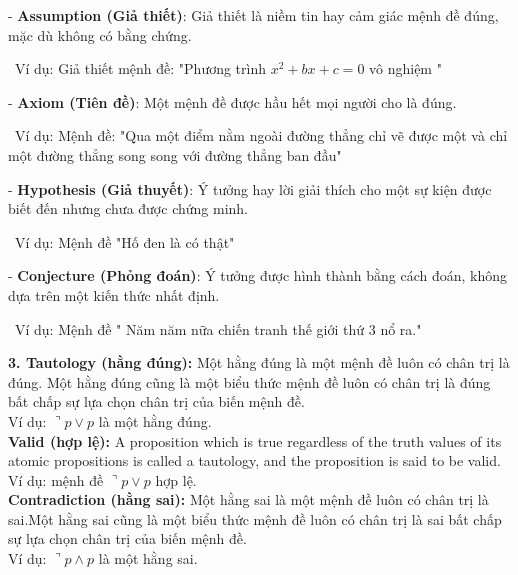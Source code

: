 \documentclass[a4paper]{article}
\begin{document}
{\large\hspace{1cm}- \textbf{Assumption (Giả thiết)}: Giả thiết là niềm tin hay cảm giác mệnh đề đúng, mặc dù không có bằng chứng.
	
\ Ví dụ: Giả thiết mệnh đề: "Phương trình $x^2 + bx + c = 0$ vô nghiệm "}

{\large\hspace{1cm}- \textbf{Axiom (Tiên đề)}: Một mệnh đề được hầu hết mọi người cho là đúng.
	
\ Ví dụ: Mệnh đề: "Qua một điểm nằm ngoài đường thẳng chỉ vẽ được một và chỉ một đường thẳng song song với đường thẳng ban đầu"}

{\large\hspace{1cm}- \textbf{Hypothesis (Giả thuyết)}: Ý tưởng hay lời giải thích cho một sự kiện được biết đến nhưng chưa được chứng minh. 
	
\ Ví dụ: Mệnh đề "Hố đen là có thật"}

{\large\hspace{1cm}- \textbf{Conjecture (Phỏng đoán)}: Ý tưởng được hình thành bằng cách đoán, không dựa trên một kiến thức nhất định.
	
	\ Ví dụ: Mệnh đề " Năm năm nữa chiến tranh thế giới thứ 3 nổ ra."}

\textbf{{\large\hspace{0.5cm} 3. Tautology (hằng đúng): }}{\large Một hằng đúng là một mệnh đề luôn có chân trị là đúng. Một hằng đúng cũng là một biểu thức mệnh đề luôn có chân trị là đúng bất chấp sự lựa chọn chân trị của biến mệnh đề.\\
	
	\hspace{1.5 cm} Ví dụ: $\urcorner p \vee p$ là một hằng đúng.
}\\

\textbf{{\large\hspace{1 cm} Valid (hợp lệ): }}
{\large A proposition which is true regardless of the truth values of its atomic propositions is called a tautology, and the proposition is said to be valid.\\
	
	\hspace{1.5 cm} Ví dụ: mệnh đề $\urcorner p \vee p$ hợp lệ.}\\

\textbf{{\large\hspace{1 cm} Contradiction (hằng sai): }}{\large Một hằng sai là một mệnh đề luôn có chân trị là sai.Một hằng sai cũng là một biểu thức mệnh đề luôn có chân trị là sai bất chấp sự lựa chọn chân trị của biến mệnh đề.\\
	
	\hspace{1.5 cm} Ví dụ: $\urcorner p \wedge p$ là một hằng sai.}\\
\end{document}
